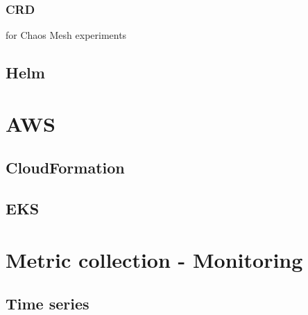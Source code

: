 \subsubsection{CRD}

for Chaos Mesh experiments

\subsection{Helm}

\section{AWS}

\subsection{CloudFormation}

\subsection{EKS}


\section{Metric collection - Monitoring}

\subsection{Time series}

